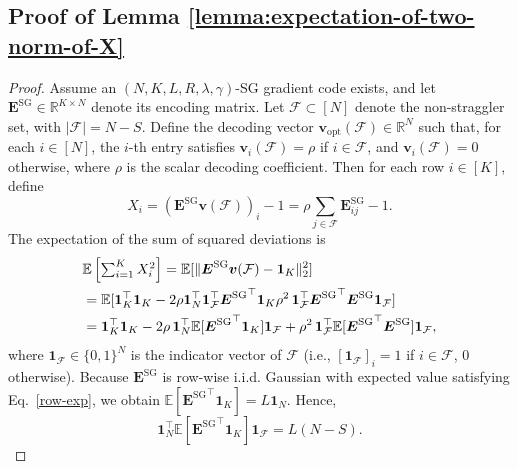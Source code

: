 \documentclass[lettersize,journal]{IEEEtran}
\renewcommand{\v}{\boldsymbol{v}}
\newcommand{\ones}[1]{\boldsymbol{1}_{#1}}
\newcommand{\F}{\mathcal{F}}
\newcommand{\vopt}{\boldsymbol{v}_{\mathrm{opt}}}
\newcommand{\GSG}{\boldsymbol{E}^{\mathrm{SG}}}
\newcommand{\RR}{\mathbb{R}}
\newcommand{\ex}[1]{\mathbb{E}\left[#1\right]}
\begin{document}
{\subsection{Proof of Lemma \ref{lemma:expectation-of-two-norm-of-X}}
\begin{proof}
\label{proof of lemma:expectation-of-two-norm-of-X}
Assume an $(N, K, L, R, \lambda, \gamma)$-SG gradient code exists, and let $\GSG \in \RR^{K\times N}$ denote its encoding matrix. 
Let $\F \subset [N]$ denote the non-straggler set, with $|\F| = N-S$. 
Define the decoding vector $\vopt(\F) \in \RR^{N}$ such that, for each $i \in [N]$, the $i$-th entry satisfies $\v_i(\F) = \rho$ if $i \in \F$, and $\v_i(\F) = 0$ otherwise, where $\rho$ is the scalar decoding coefficient.
Then for each row $i \in [K]$, define
\[
X_i = (\GSG\v(\F))_i - 1 = \rho \textstyle\sum_{j\in\F}\GSG_{ij} - 1.
\]
The expectation of the sum of squared deviations is
\begin{align}
&\ex{\textstyle\sum_{i=1}^{K}X_i^2} \notag = \mathbb{E}[\|\GSG\v(\F) - \ones{K}\|_2^2]\notag\\
& = \mathbb{E}[\ones{K}^\top\ones{K} - 2\rho\ones{N}^\top \ones{\F}^\top {\GSG}^\top \ones{K} \rho^2\, \ones{\F}^\top {\GSG}^\top \GSG \ones{\F}]\notag\\
& = \ones{K}^\top\ones{K}
    - 2\rho\,\ones{N}^\top\mathbb{E}[{\GSG}^\top\ones{K}]\ones{\F}\notag+ \rho^2\, \ones{\F}^\top \mathbb{E}[{\GSG}^\top\GSG] \ones{\F},
    \label{eq:expectation-of-the-sum-of-squared-deviations}
\end{align}
where $\ones{\F}\in\{0,1\}^N$ is the indicator vector of $\F$ (i.e., $[\ones{\F}]_i = 1$ if $i\in\F$, $0$ otherwise). 
Because $\GSG$ is row-wise i.i.d. Gaussian with expected value satisfying Eq.~\eqref{row-exp}, we obtain $\ex{{\GSG}^\top\ones{K}} = L\ones{N}.$
Hence,
\[
\ones{N}^\top\ex{{\GSG}^\top\ones{K}}\ones{\F} = L(N-S).
\]


\end{proof}}
\end{document}
